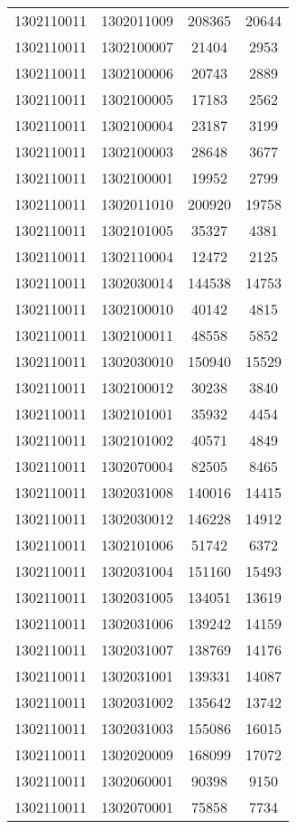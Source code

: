 \begin{longtable}[h]{llcc}
		1302110011 & 1302011009 & 208365 & 20644\\
		1302110011 & 1302100007 & 21404 & 2953\\
		1302110011 & 1302100006 & 20743 & 2889\\
		1302110011 & 1302100005 & 17183 & 2562\\
		1302110011 & 1302100004 & 23187 & 3199\\
		1302110011 & 1302100003 & 28648 & 3677\\
		1302110011 & 1302100001 & 19952 & 2799\\
		1302110011 & 1302011010 & 200920 & 19758\\
		1302110011 & 1302101005 & 35327 & 4381\\
		1302110011 & 1302110004 & 12472 & 2125\\
		1302110011 & 1302030014 & 144538 & 14753\\
		1302110011 & 1302100010 & 40142 & 4815\\
		1302110011 & 1302100011 & 48558 & 5852\\
		1302110011 & 1302030010 & 150940 & 15529\\
		1302110011 & 1302100012 & 30238 & 3840\\
		1302110011 & 1302101001 & 35932 & 4454\\
		1302110011 & 1302101002 & 40571 & 4849\\
		1302110011 & 1302070004 & 82505 & 8465\\
		1302110011 & 1302031008 & 140016 & 14415\\
		1302110011 & 1302030012 & 146228 & 14912\\
		1302110011 & 1302101006 & 51742 & 6372\\
		1302110011 & 1302031004 & 151160 & 15493\\
		1302110011 & 1302031005 & 134051 & 13619\\
		1302110011 & 1302031006 & 139242 & 14159\\
		1302110011 & 1302031007 & 138769 & 14176\\
		1302110011 & 1302031001 & 139331 & 14087\\
		1302110011 & 1302031002 & 135642 & 13742\\
		1302110011 & 1302031003 & 155086 & 16015\\
		1302110011 & 1302020009 & 168099 & 17072\\
		1302110011 & 1302060001 & 90398 & 9150\\
		1302110011 & 1302070001 & 75858 & 7734\\

\end{longtable}
